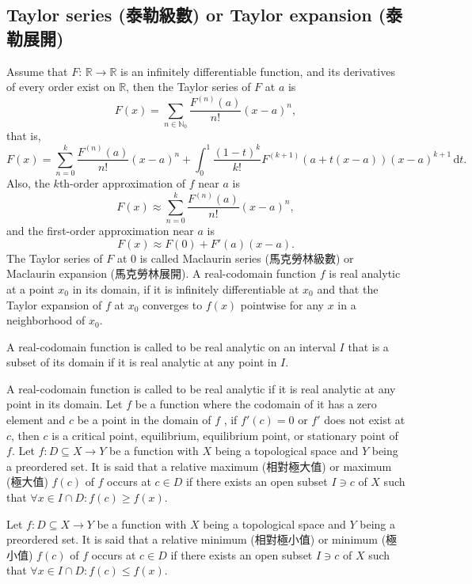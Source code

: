 \documentclass[a4paper,12pt]{report}
\begin{document}
\subsection{Taylor series (泰勒級數) or Taylor expansion (泰勒展開)}
Assume that $F:\,\mathbb{R}\to\mathbb{R}$ is an infinitely differentiable function, and its derivatives of every order exist on $\mathbb{R}$, then the Taylor series of $F$ at $a$ is
\[F(x) = \sum_{n\in\mathbb{N}_0} \frac{F^{(n)}(a)}{n!}(x-a)^n,\]
that is,
\[F(x) = \sum^k_{n=0} \frac{F^{(n)}(a)}{n!}(x-a)^n+\int_0^1\frac{(1-t)^k}{k!}F^{(k+1)}(a+t(x-a))(x-a)^{k+1}\,\mathrm{d}t.\]
Also, the $k$th-order approximation of $f$ near $a$ is
\[F(x) \approx \sum^k_{n=0} \frac{F^{(n)}(a)}{n!}(x-a)^n,\]
and the first-order approximation near $a$ is
\[F(x) \approx F(0)+F'(a)(x-a).\]
The Taylor series of $F$ at $0$ is called Maclaurin series (馬克勞林級數) or Maclaurin expansion (馬克勞林展開).
A real-codomain function $f$ is real analytic at a point $x_0$ in its domain, if it is infinitely differentiable at $x_0$ and that the Taylor expansion of $f$ at $x_0$ converges to $f(x)$ pointwise for any $x$ in a neighborhood of $x_0$.

A real-codomain function is called to be real analytic on an interval $I$ that is a subset of its domain if it is real analytic at any point in $I$.

A real-codomain function is called to be real analytic if it is real analytic at any point in its domain.
Let $f$ be a function where the codomain of it has a zero element and \( c \) be a point in the domain of $f$ , if \( f'(c) = 0 \) or \( f' \) does not exist at \( c \), then \( c \) is a critical point, equilibrium, equilibrium point, or stationary point of \( f \).
Let $f\colon D\subseteq X\to Y$ be a function with $X$ being a topological space and $Y$ being a preordered set. It is said that a relative maximum (相對極大值) or maximum (極大值) \( f(c) \) of \(f\) occurs at $c\in D$ if there exists an open subset $I\ni c$ of $X$ such that \( \forall x\in I\cap D\colon f(c) \geq f(x) \).

Let $f\colon D\subseteq X\to Y$ be a function with $X$ being a topological space and $Y$ being a preordered set. It is said that a relative minimum (相對極小值) or minimum (極小值) \( f(c) \) of \(f\) occurs at $c\in D$ if there exists an open subset $I\ni c$ of $X$ such that \( \forall x\in I\cap D\colon f(c) \leq f(x) \).
\end{document}
